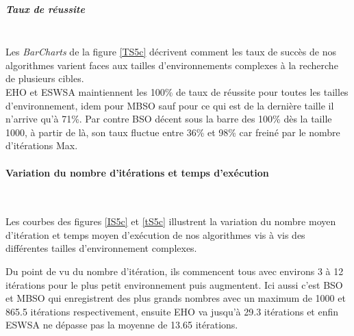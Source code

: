 \noindent
\begin{minipage}[t]{0.5\textwidth}
	\subparagraph{Taux de réussite}
	\textbf{}\\
	
	Les \textit{BarCharts} de la figure \ref{TS5c} décrivent comment les taux de succès de nos algorithmes varient faces aux tailles d'environnements complexes à la recherche de plusieurs cibles.\\
	
	EHO et ESWSA maintiennent les 100\% de taux de réussite pour toutes les tailles d'environnement, idem pour MBSO sauf pour ce qui est de la dernière taille il n'arrive qu'à 71\%. Par contre BSO décent sous la barre des 100\% dès la taille 1000, à partir de là, son taux fluctue entre 36\% et 98\% car freiné par le nombre d'itérations Max.
	
\end{minipage}\hfill
\begin{minipage}[t]{0.55\textwidth}
	\captionsetup{width=0.8\linewidth}
	\centering{}
	\label{TS5c}
\end{minipage}\hfill




\noindent
	\paragraph{Variation du nombre d'itérations et temps d'exécution}
	\textbf{ }\\
	\vspace{-0.2cm}
	
	Les courbes des figures \ref{IS5c} et \ref{tS5c} illustrent la variation du nombre moyen d'itération et temps moyen d'exécution de nos algorithmes vis à vis des différentes tailles d'environnement complexes.\\
	\vspace{-0.2cm}
		
	Du point de vu du nombre d'itération, ils commencent tous avec environs 3 à 12 itérations pour le plus petit environnement puis augmentent. Ici aussi c'est BSO et MBSO qui enregistrent des plus grands nombres avec un maximum de 1000 et 865.5 itérations respectivement, ensuite EHO va jusqu'à 29.3 itérations et enfin ESWSA ne dépasse pas la moyenne de 13.65 itérations.\\
	\vspace{-0.2cm}
	
